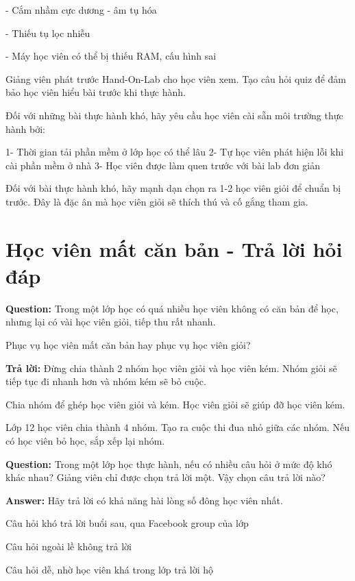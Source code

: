 - Cắm nhầm cực dương - âm tụ hóa

- Thiếu tụ lọc nhiễu

- Máy học viên có thể bị thiếu RAM, cấu hình sai

Giảng viên phát trước Hand-On-Lab cho học viên xem. Tạo câu hỏi quiz để đảm bảo học viên hiểu bài trước khi thực hành.

Đối với những bài thực hành khó, hãy yêu cầu học viên cài sẵn môi trường thực hành bởi:

1- Thời gian tải phần mềm ở lớp học có thể lâu
2- Tự học viên phát hiện lỗi khi cài phần mềm ở nhà
3- Học viên được làm quen trước với bài lab đơn giản

Đối với bài thực hành khó, hãy mạnh dạn chọn ra 1-2 học viên giỏi để chuẩn bị trước. Đây là đặc ân mà học viên giỏi sẽ thích thú và cố gắng tham gia.

\section{Học viên mất căn bản - Trả lời hỏi đáp}

\textbf{Question:} Trong một lớp học có quá nhiều học viên không có căn bản để học, nhưng lại có vài học viên giỏi, tiếp thu rất nhanh.

Phục vụ học viên mất căn bản hay phục vụ học viên giỏi?

\textbf{Trả lời:} Đừng chia thành 2 nhóm học viên giỏi và học viên kém. Nhóm giỏi sẽ tiếp tục đi nhanh hơn và nhóm kém sẽ bỏ cuộc.

Chia nhóm để ghép học viên giỏi và kém. Học viên giỏi sẽ giúp đỡ học viên kém.

Lớp 12 học viên chia thành 4 nhóm. Tạo ra cuộc thi đua nhỏ giữa các nhóm. Nếu có học viên bỏ học, sắp xếp lại nhóm.

\textbf{Question:} Trong một lớp học thực hành, nếu có nhiều câu hỏi ở mức độ khó khác nhau? Giảng viên chỉ được chọn trả lời một. Vậy chọn câu trả lời nào?

\textbf{Answer:} Hãy trả lời có khả năng hài lòng số đông học viên nhất.

Câu hỏi khó trả lời buổi sau, qua Facebook group của lớp

Câu hỏi ngoài lề không trả lời

Câu hỏi dễ, nhờ học viên khá trong lớp trả lời hộ